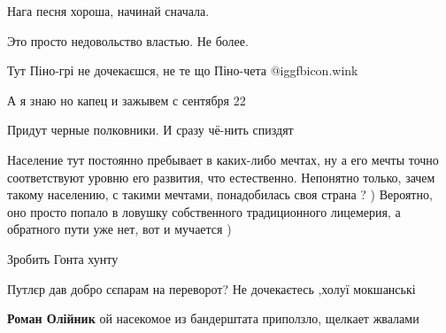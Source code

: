 \begin{itemize}
Нага песня хороша, начинай сначала.

Это просто недовольство властью. Не более.

Тут Піно-грі не дочекаєшся, не те що Піно-чета  @igg{fbicon.wink} 

А я знаю но капец и зажывем с сентября 22

Придут черные полковники. И сразу чё-нить спиздят


Население тут постоянно пребывает в каких-либо мечтах, ну а его мечты точно
соответствуют уровню его развития, что естественно. Непонятно только, зачем
такому населению, с такими мечтами, понадобилась своя страна ? ) Вероятно, оно
просто попало в ловушку собственного традиционного лицемерия, а обратного пути
уже нет, вот и мучается )


Зробить Гонта хунту

Путлєр дав добро сєпарам на переворот? Не дочекаєтесь ,холуї мокшанські

\begin{itemize} %
\textbf{Роман Олійник} ой насекомое из бандерштата приползло, щелкает жвалами
\end{itemize} %


\end{itemize} %
